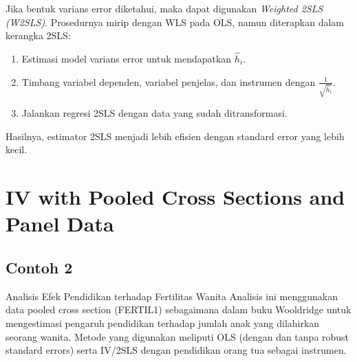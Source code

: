\documentclass[]{article}
\begin{document}
Jika bentuk varians error diketahui, maka dapat digunakan \textit{Weighted 2SLS (W2SLS)}.
Prosedurnya mirip dengan WLS pada OLS, namun diterapkan dalam kerangka 2SLS:

\begin{enumerate}
    \item Estimasi model varians error untuk mendapatkan $\hat{h}_i$.
    \item Timbang variabel dependen, variabel penjelas, dan instrumen dengan $\frac{1}{\sqrt{\hat{h}_i}}$.
    \item Jalankan regresi 2SLS dengan data yang sudah ditransformasi.
\end{enumerate}

Hasilnya, estimator 2SLS menjadi lebih efisien dengan standard error yang lebih kecil.

\newpage
\section{IV with Pooled Cross Sections and Panel Data}
\subsection{Contoh 2}
Analisis Efek Pendidikan terhadap Fertilitas Wanita
Analisis ini menggunakan data pooled cross section (FERTIL1) sebagaimana dalam buku Wooldridge untuk mengestimasi pengaruh pendidikan terhadap jumlah anak yang dilahirkan seorang wanita. Metode yang digunakan meliputi OLS (dengan dan tanpa robust standard errors) serta IV/2SLS dengan pendidikan orang tua sebagai instrumen.
\end{document}
